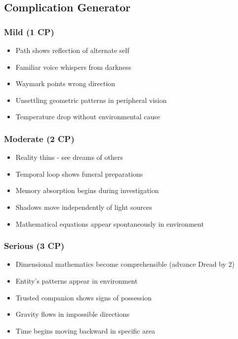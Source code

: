 \documentclass[11pt]{article}
\begin{document}
\subsection{Complication Generator}

\subsubsection{Mild (1 CP)}
\begin{itemize}
\item Path shows reflection of alternate self
\item Familiar voice whispers from darkness
\item Waymark points wrong direction
\item Unsettling geometric patterns in peripheral vision
\item Temperature drop without environmental cause
\end{itemize}

\subsubsection{Moderate (2 CP)}
\begin{itemize}
\item Reality thins - see dreams of others
\item Temporal loop shows funeral preparations
\item Memory absorption begins during investigation
\item Shadows move independently of light sources
\item Mathematical equations appear spontaneously in environment
\end{itemize}

\subsubsection{Serious (3 CP)}
\begin{itemize}
\item Dimensional mathematics become comprehensible (advance Dread by 2)
\item Entity's patterns appear in environment
\item Trusted companion shows signs of possession
\item Gravity flows in impossible directions
\item Time begins moving backward in specific area
\end{itemize}
\end{document}
